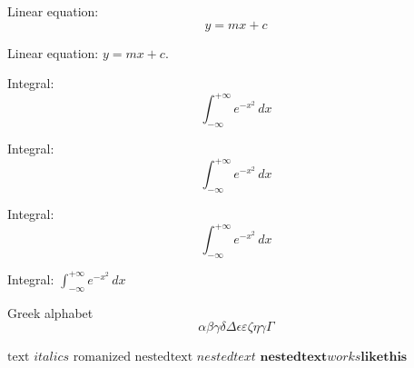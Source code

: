 \documentclass[fleqn,leqno]{article}
\begin{document}
Linear equation:
\[
  y = mx + c
\]

Linear equation: $y = mx + c$.

Integral:
\[
\int_{-\infty}^{+\infty} e^{-x^2} \, dx
\]

Integral:
\begin{equation}
\int_{-\infty}^{+\infty} e^{-x^2} \, dx
\end{equation}

Integral:
\begin{equation*}
\int_{-\infty}^{+\infty} e^{-x^2} \, dx
\end{equation*}

Integral: $\int_{-\infty}^{+\infty} e^{-x^2} \, dx$ %

Greek alphabet
\[
\alpha  \beta \gamma \delta \Delta \epsilon \varepsilon \zeta \eta \gamma \Gamma
\]

$\text{text}$
$\mathit{italics}$
$\mathrm{romanized}$
$\mathit{\mathrm{nested text}}$
$\mathrm{\mathit{nested text}}$
$\mathbf{nested text \mathit{works} like this}$
\end{document}
